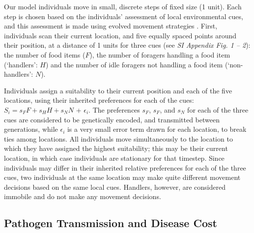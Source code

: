 Our model individuals move in small, discrete steps of fixed size (1 unit).
Each step is chosen based on the individuals' assessment of local environmental cues, and this assessment is made using evolved movement strategies \citep[as in][]{netz2021a,gupte2021a}.
First, individuals scan their current location, and five equally spaced points 
around their position, at a distance of 1 units for three cues (see \textit{SI Appendix Fig. 1 -- 2}): the number of food items ($F$), the number of foragers handling a food item (`handlers': $H$) and the number of idle foragers not handling a food item (`non-handlers': $N$).

Individuals assign a suitability \citep[see][]{netz2021a,gupte2021a} to their current position and each of the five locations, using their inherited preferences for each of the cues: $S_i = s_FF + s_HH + s_NN$ + $\epsilon_i$.
The preferences $s_F$, $s_F$, and $s_N$ for each of the three cues are considered to be genetically encoded, and transmitted between generations, while $\epsilon_i$ is a very small error term drawn for each location, to break ties among locations.
All individuals move simultaneously to the location to which they have assigned the highest suitability; this may be their current location, in which case individuals are stationary for that timestep.
Since individuals may differ in their inherited relative preferences for each of the three cues, two individuals at the same location may make quite different movement decisions based on the same local cues.
Handlers, however, are considered immobile and do not make any movement decisions.

\subsection*{Pathogen Transmission and Disease Cost}

